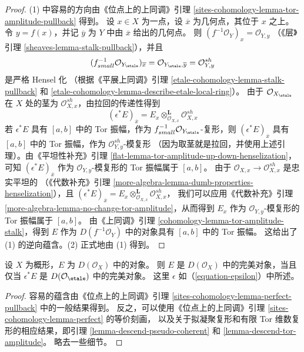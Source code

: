 \begin{proof}
(1) 中容易的方向由《位点上的上同调》引理
\ref{sites-cohomology-lemma-tor-amplitude-pullback} 得到。
设 $x \in X$ 为一点，设 $\overline{x}$ 为几何点，其位于 $x$ 之上。
令 $y = f(x)$，并记 $\overline{y}$ 为 $Y$ 中由 $\overline{x}$ 给出的几何点。
则 $(f^{-1}\mathcal{O}_Y)_x = \mathcal{O}_{Y, y}$
（《层》引理 \ref{sheaves-lemma-stalk-pullback}），并且
$$
(f_{small}^{-1}\mathcal{O}_{Y_\etale})_{\overline{x}} =
\mathcal{O}_{Y_\etale, \overline{y}} =
\mathcal{O}_{Y, y}^{sh}
$$
是严格 Hensel 化
（根据《平展上同调》引理
\ref{etale-cohomology-lemma-stalk-pullback}
和 \ref{etale-cohomology-lemma-describe-etale-local-ring}）。
由于 $\mathcal{O}_{X_\etale}$ 在 $X$ 处的茎为
$\mathcal{O}_{X, x}^{sh}$，由拉回的传递性得到 %
$$
(\epsilon^*E)_{\overline{x}} =
E_x \otimes_{\mathcal{O}_{X, x}}^\mathbf{L} \mathcal{O}_{X, x}^{sh}
$$
若 $\epsilon^*E$ 具有 $[a, b]$ 中的 Tor 振幅，作为
$f_{small}^{-1}\mathcal{O}_{Y_\etale}$-复形，则 $(\epsilon^*E)_{\overline{x}}$
具有 $[a, b]$ 中的 Tor 振幅，作为 $\mathcal{O}_{Y, y}^{sh}$-模复形
（因为取茎就是拉回，并使用上述引理）。由《平坦性补充》引理
\ref{flat-lemma-tor-amplitude-up-down-henselization}，可知
$(\epsilon^*E)_{\overline{x}}$
作为 $\mathcal{O}_{Y, y}$-模复形的 Tor 振幅属于 $[a, b]$。
由于 $\mathcal{O}_{X, x} \to \mathcal{O}_{X, x}^{sh}$ 是忠实平坦的
（《代数补充》引理
\ref{more-algebra-lemma-dumb-properties-henselization}），且
$(\epsilon^*E)_{\overline{x}} =
E_x \otimes_{\mathcal{O}_{X, x}}^\mathbf{L} \mathcal{O}_{X, x}^{sh}$，
我们可以应用《代数补充》引理
\ref{more-algebra-lemma-no-change-tor-amplitude}，从而得到
$E_x$ 作为 $\mathcal{O}_{Y, y}$-模复形的 Tor 振幅属于 $[a, b]$。
由《上同调》引理 \ref{cohomology-lemma-tor-amplitude-stalk}，得到
$E$ 作为 $D(f^{-1}\mathcal{O}_Y)$ 中的对象具有 $[a, b]$ 中的 Tor 振幅。
这给出了 (1) 的逆向蕴含。(2) 正式地由 (1) 得到。
\end{proof}

\begin{lemma}
\label{lemma-descend-perfect}
设 $X$ 为概形，$E$ 为 $D(\mathcal{O}_X)$ 中的对象。
则 $E$ 是 $D(\mathcal{O}_X)$ 中的完美对象，当且仅当
$\epsilon^*E$ 是 $D(\mathcal{O}_\etale)$ 中的完美对象。
这里 $\epsilon$ 如（\ref{equation-epsilon}）中所述。
\end{lemma}

\begin{proof}
容易的蕴含由《位点上的上同调》引理
\ref{sites-cohomology-lemma-perfect-pullback} 中的一般结果得到。
反之，可以使用《位点上的上同调》引理
\ref{sites-cohomology-lemma-perfect} 的等价刻画，
以及关于拟凝聚复形和有限 Tor 维数复形的相应结果，即引理
\ref{lemma-descend-pseudo-coherent} 和
\ref{lemma-descend-tor-amplitude}。
略去一些细节。
\end{proof}


